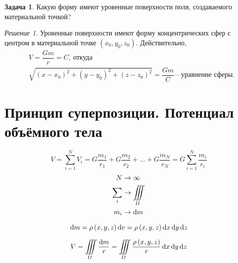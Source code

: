 \documentclass[11pt, a4paper]{article}
\theoremstyle{plain}
\theoremstyle{definition}
\newtheorem{problem}{Задача}[section]
\theoremstyle{remark}
\newtheorem*{solution}{Решение}
\begin{document}
\begin{problem}
    Какую форму имеют уровенные поверхности поля, создаваемого материальной точкой?
\end{problem}
\begin{solution}
    Уровенные поверхности имеют форму концентрических сфер с центром в материальной точке $(x_0, y_0, z_0)$. Действительно,
    \begin{align*}
        &V = \dfrac{Gm}{r} = C,\ \text{откуда} \\
        &\sqrt{\left( x - x_0 \right)^2 +
        \left( y - y_0 \right)^2 + \left( z - z_0 \right)^2} = \dfrac{Gm}{C} \text{---уравнение
        сферы}. 
    \end{align*}
\end{solution}

\section{Принцип суперпозиции. Потенциал объёмного тела}
\begin{equation*}
    V = \sum\limits_{i=1}^{N} V_i = G\dfrac{m_1}{r_1} + G\dfrac{m_2}{r_2} + \dots +
    G\dfrac{m_N}{r_N} = G\sum\limits_{i=1}^{N} \dfrac{m_i}{r_i}
\end{equation*}
\begin{align*}
    N &\to \infty\\
    \sum\limits_{i}&\to\iiint\limits_{\Omega} \\
    m_i&\to\dif m
\end{align*}

\begin{equation*}
    \dif m = \rho\left( x, y, z \right)\dif v = \rho\left( x, y, z \right)\dif x\dif y\dif z
\end{equation*}

\begin{equation*}
    V = \iiint\limits_{\Omega}\dfrac{\dif m}{r} = 
    \iiint\limits_{\Omega}\dfrac{\rho\left( x, y, z \right)}{r}\dif x\dif y\dif z
\end{equation*}

\printbibliography
\end{document}
